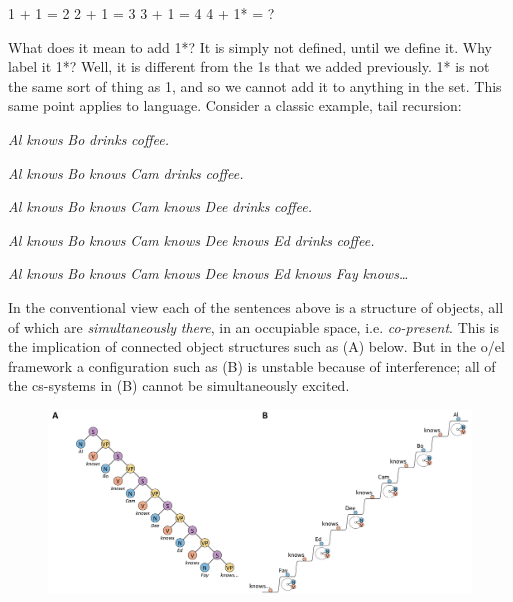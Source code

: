     1 + 1 = 2    2 + 1 = 3     3 + 1 = 4    4 + 1* = ?

  What does it mean to add 1*? It is simply not defined, until we define it. Why label it 1*? Well, it is different from the 1s that we added previously. 1* is not the same sort of thing as 1, and so we cannot add it to anything in the set. This same point applies to language. Consider a classic example, tail recursion:

\textit{Al} \textit{knows} \textit{Bo} \textit{drinks} \textit{coffee.}

\textit{Al} \textit{knows} \textit{Bo} \textit{knows} \textit{Cam} \textit{drinks} \textit{coffee.}

\textit{Al} \textit{knows} \textit{Bo} \textit{knows} \textit{Cam} \textit{knows} \textit{Dee} \textit{drinks} \textit{coffee.}

\textit{Al} \textit{knows} \textit{Bo} \textit{knows} \textit{Cam} \textit{knows} \textit{Dee} \textit{knows} \textit{Ed} \textit{drinks} \textit{coffee.}

\textit{Al} \textit{knows} \textit{Bo} \textit{knows} \textit{Cam} \textit{knows} \textit{Dee} \textit{knows} \textit{Ed} \textit{knows} \textit{Fay} \textit{knows…}

  In the conventional view each of the sentences above is a structure of objects, all of which are \textit{simultaneously} \textit{there}, in an occupiable space, i.e. \textit{co-present}. This is the implication of connected object structures such as (A) below. But in the o/el framework a configuration such as (B) is unstable because of interference; all of the cs-systems in (B) cannot be simultaneously excited. 

  
\begin{figure}
\includegraphics[width=\textwidth]{figures/Tilsen-img105.png}
\caption{\missingcaption}
\label{fig:}
\end{figure}
 

